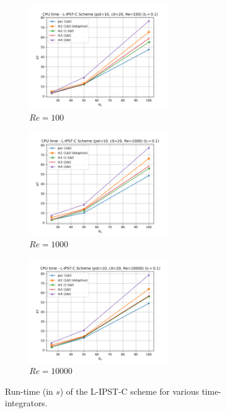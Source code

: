 \begin{figure}[H]
  \begin{subfigure}{7cm}
    \centering\includegraphics[width=6cm]{Code-Figures/lipstc/integrator/pois_rt_pst_10_c0_20_re_100.png}
    \caption{$Re = 100$}
  \end{subfigure}
  \begin{subfigure}{7cm}
    \centering\includegraphics[width=6cm]{Code-Figures/lipstc/integrator/pois_rt_pst_10_c0_20_re_1000.png}
    \caption{$Re = 1000$}
  \end{subfigure}
  \begin{subfigure}{7cm}
    \centering\includegraphics[width=6cm]{Code-Figures/lipstc/integrator/pois_rt_pst_10_c0_20_re_10000.png}
    \caption{$Re = 10000$}
  \end{subfigure}
  \caption{Run-time (in $s$) of the L-IPST-C scheme for various time-integrators.}
  \label{fig:lipstc-integrator-rt}
\end{figure}


